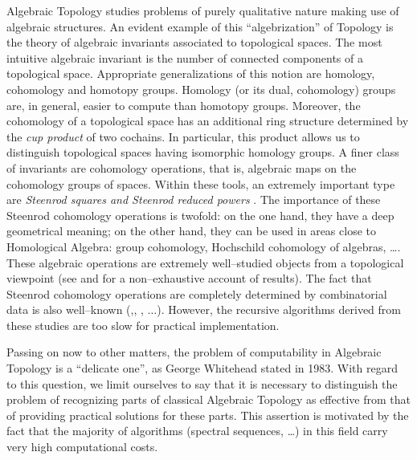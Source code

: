 Algebraic Topology studies problems of purely qualitative nature
making use of algebraic structures. An evident example of this
``algebrization'' of Topology is the theory of algebraic invariants
associated to topological spaces. The most intuitive algebraic
invariant is the number of connected components of a topological
space. Appropriate generalizations of this notion are  homology,
cohomology and homotopy groups. Homology (or its dual,
cohomology) groups are, in general, easier to compute than homotopy
groups. Moreover, the cohomology of a topological space has an
additional ring structure determined by the {\em cup product} of
two cochains. In particular, this product allows us to distinguish
topological spaces having isomorphic homology groups. A finer class
of invariants are cohomology operations, that is, algebraic maps
on the cohomology groups of spaces. Within these tools, an extremely
important type are
 {\em Steenrod squares and Steenrod
reduced powers} \cite{SE62, Mil58}. The importance of these
Steenrod cohomology operations is twofold: on the one hand, they have a
deep geometrical meaning; on the other hand, they can be
used in areas close to Homological Algebra: group cohomology,
Hochschild cohomology of algebras, \ldots. These
algebraic operations are extremely well--studied objects from
a topological viewpoint (see \cite{Woo98} and \cite{Die89}
   for a non--exhaustive account of results). The fact
that Steenrod cohomology operations are completely determined by
combinatorial data is also well--known (\cite{May67},\cite{DOLD},
\cite{May70}, $\ldots$). However, the
recursive algorithms derived from these studies
are too slow for practical implementation.

    Passing on now to other matters, the problem of computability in
    Algebraic Topology is a ``delicate one'', as  George
    Whitehead stated in 1983. With regard  to this question, we
    limit ourselves to say that
    it is necessary to distinguish the problem of recognizing
    parts of classical Algebraic Topology as effective from that
    of providing practical solutions for these parts. This
      assertion is motivated by
    the fact that the
    majority of algorithms (spectral sequences, \ldots)  in this field
    carry very high computational costs.

